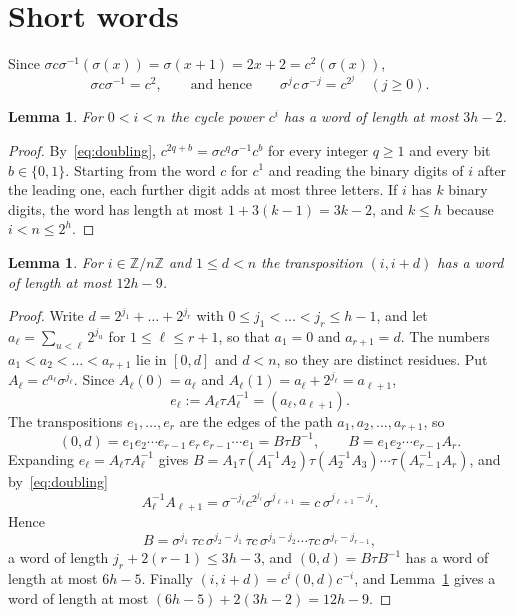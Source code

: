 \documentclass[11pt]{amsart}
\newtheorem{lemma}[theorem]{Lemma}
\theoremstyle{remark}
\numberwithin{equation}{section}
\newcommand{\Z}{\mathbb{Z}}
\begin{document}
\section{Short words}\label{sec:words}

Since $\sigma c\sigma^{-1}(\sigma(x))=\sigma(x+1)=2x+2=c^2(\sigma(x))$,
\begin{equation}\label{eq:doubling}
 \sigma c\sigma^{-1}=c^2,\qquad\text{and hence}\qquad \sigma^{j}c\,\sigma^{-j}=c^{2^j}\quad(j\ge0).
\end{equation}

\begin{lemma}\label{lem:powers}
For $0<i<n$ the cycle power $c^i$ has a word of length at most $3h-2$.
\end{lemma}

\begin{proof}
By~\eqref{eq:doubling}, $c^{2q+b}=\sigma c^{q}\sigma^{-1}c^{b}$ for every integer $q\ge1$ and every bit $b\in\{0,1\}$. Starting from the word $c$ for $c^1$ and reading the binary digits of $i$ after the leading one, each further digit adds at most three letters. If $i$ has $k$ binary digits, the word has length at most $1+3(k-1)=3k-2$, and $k\le h$ because $i<n\le 2^h$.
\end{proof}

\begin{lemma}\label{lem:transposition}
For $i\in\Z/n\Z$ and $1\le d<n$ the transposition $(i,i+d)$ has a word of length at most $12h-9$.
\end{lemma}

\begin{proof}
Write $d=2^{j_1}+\dots+2^{j_r}$ with $0\le j_1<\dots<j_r\le h-1$, and let $a_\ell=\sum_{u<\ell}2^{j_u}$ for $1\le\ell\le r+1$, so that $a_1=0$ and $a_{r+1}=d$. The numbers $a_1<a_2<\dots<a_{r+1}$ lie in $[0,d]$ and $d<n$, so they are distinct residues. Put $A_\ell=c^{a_\ell}\sigma^{j_\ell}$. Since $A_\ell(0)=a_\ell$ and $A_\ell(1)=a_\ell+2^{j_\ell}=a_{\ell+1}$,
\[
 e_\ell:=A_\ell\tau A_\ell^{-1}=(a_\ell,a_{\ell+1}).
\]
The transpositions $e_1,\dots,e_r$ are the edges of the path $a_1,a_2,\dots,a_{r+1}$, so
\[
 (0,d)=e_1e_2\cdots e_{r-1}\,e_r\,e_{r-1}\cdots e_1=B\tau B^{-1},\qquad B=e_1e_2\cdots e_{r-1}A_r .
\]
Expanding $e_\ell=A_\ell\tau A_\ell^{-1}$ gives $B=A_1\tau(A_1^{-1}A_2)\tau(A_2^{-1}A_3)\cdots\tau(A_{r-1}^{-1}A_r)$, and by~\eqref{eq:doubling}
\[
 A_\ell^{-1}A_{\ell+1}=\sigma^{-j_\ell}c^{2^{j_\ell}}\sigma^{j_{\ell+1}}=c\,\sigma^{j_{\ell+1}-j_\ell}.
\]
Hence
\[
 B=\sigma^{j_1}\,\tau c\,\sigma^{j_2-j_1}\,\tau c\,\sigma^{j_3-j_2}\cdots\tau c\,\sigma^{j_r-j_{r-1}},
\]
a word of length $j_r+2(r-1)\le 3h-3$, and $(0,d)=B\tau B^{-1}$ has a word of length at most $6h-5$. Finally $(i,i+d)=c^{i}(0,d)c^{-i}$, and Lemma~\ref{lem:powers} gives a word of length at most $(6h-5)+2(3h-2)=12h-9$.
\end{proof}
\end{document}
